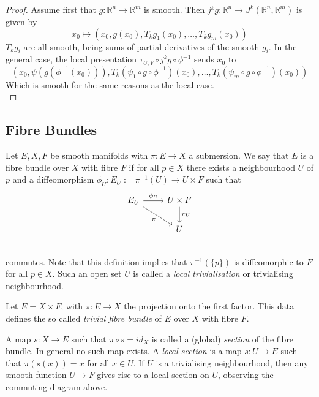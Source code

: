 \documentclass[12pt]{article}
\newcommand{\RR}{\mathbb{R}}
\begin{document}
\begin{proof}
    Assume first that $g: \RR^n \to \RR^m$ is smooth. Then $j^k g: \RR^n \to J^k(\RR^n, \RR^m)$ is given by 
    $$
    x_0 \mapsto (x_0, g(x_0), T_k g_1 (x_0), \dots, T_k g_m (x_0) ) 
    $$
    $T_k g_i$ are all smooth, being sums of partial derivatives of the smooth $g_i$. In the general case, the local presentation $\tau_{U, V}\circ j^k g \circ \phi^{-1}$ sends $x_0$ to 
    $$
    (x_0, \psi(g(\phi^{-1}(x_0))), T_k (\psi_1 \circ g \circ \phi^{-1}) (x_0), \dots, T_k (\psi_m \circ g \circ \phi^{-1}) (x_0))
    $$
    Which is smooth for the same reasons as the local case. \\
\end{proof}

\subsection{Fibre Bundles}
\begin{definition}
    Let $E, X, F$ be smooth manifolds with $\pi: E \to X$ a submersion. We say that $E$ is a fibre bundle over $X$ with fibre $F$ if for all $p\in X$ there exists a neighbourhood $U$ of $p$ and a diffeomorphism $\phi_U: E_U := \pi^{-1}(U) \to U \times F$ such that 
    $$
    \begin{tikzcd}
        E_U \arrow[r, "\phi_U"] \arrow[dr, "\pi"'] & U \times F \arrow[d, "\pi_U"] \\ 
        & U \\ 
    \end{tikzcd}
    $$
    commutes. Note that this definition implies that $\pi^{-1}(\{p\})$ is diffeomorphic to $F$ for all $p\in X$. Such an open set $U$ is called a \emph{local trivialisation} or trivialising neighbourhood. \\
\end{definition}

\begin{example}
    Let $E = X\times F$, with $\pi: E \to X$ the projection onto the first factor. This data defines the so called \emph{trivial fibre bundle} of $E$ over $X$ with fibre $F$.  
\end{example}

\begin{definition}
    A map $s: X \to E$ such that $\pi \circ s = id_X$ is called a (global) \emph{section} of the fibre bundle. In general no such map exists. A \emph{local section} is a map $s: U \to E$ such that $\pi(s(x)) = x$ for all $x\in U$. If $U$ is a trivialising neighbourhood, then any smooth function $U \to F$ gives rise to a local section on $U$, observing the commuting diagram above. 
\end{definition}
\end{document}
